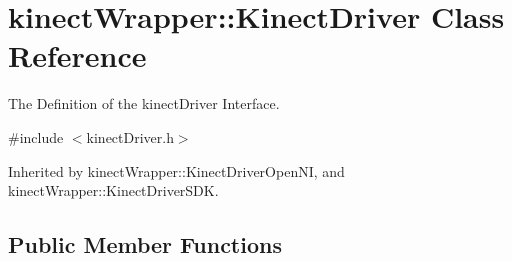 \section{kinect\+Wrapper\+:\+:Kinect\+Driver Class Reference}
\label{classkinectWrapper_1_1KinectDriver}


The Definition of the kinect\+Driver Interface.  




{\ttfamily \#include $<$kinect\+Driver.\+h$>$}



Inherited by kinect\+Wrapper\+::\+Kinect\+Driver\+Open\+NI, and kinect\+Wrapper\+::\+Kinect\+Driver\+S\+DK.

\subsection*{Public Member Functions}
